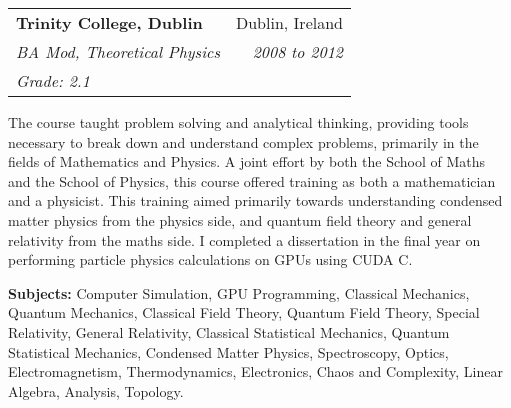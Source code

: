 \documentclass[11pt]{article}
\makeatletter
\newcommand{\resumeSection}[1]{
    \par
    \vspace{\baselineskip}
    \large {\sc {#1}}
    \par
    \vspace{-0.9\baselineskip}
    \hrulefill
    \vspace{0.5\baselineskip}
    \par
}
\newenvironment{resumeSubSectionHeader}{
    \par
    \begin{tabular*}{\textwidth}{l@{\extracolsep{\fill}}r}
    \par
} {
    \end{tabular*}
    \par
}
\newenvironment{resumeSubSectionBody}{
    \par
    \vspace{-0.8\parskip}
    \begin{small}
    \par
} {
    \par
    \end{small}
    \par
}
\makeatother
\begin{document}
%
%
\begin{resumeSubSectionHeader}

    \textbf{Trinity College, Dublin}   & Dublin, Ireland     \\
    \emph{BA Mod, Theoretical Physics} & \emph{2008 to 2012} \\
    \emph{Grade: 2.1}

\end{resumeSubSectionHeader}
\begin{resumeSubSectionBody}

    The course taught problem solving and analytical thinking, providing
    tools necessary to break down and understand complex problems,
    primarily in the fields of Mathematics and Physics.
    A joint effort by both the School of Maths and the School of Physics,
    this course offered training as both a mathematician and a
    physicist.
    This training aimed primarily towards understanding condensed matter
    physics from the physics side, and quantum field theory and general
    relativity from the maths side.
    I completed a dissertation in the final year on performing particle
    physics calculations on GPUs using CUDA C.

    \begin{description}
        \item{\bf Subjects:}
            Computer Simulation, GPU Programming,
            Classical Mechanics, Quantum Mechanics,
            Classical Field Theory, Quantum Field Theory,
            Special Relativity, General Relativity,
            Classical Statistical Mechanics, Quantum Statistical Mechanics,
            Condensed Matter Physics, Spectroscopy,
            Optics, Electromagnetism, Thermodynamics,
            Electronics, Chaos and Complexity,
            Linear Algebra, Analysis,
            Topology.
    \end{description}

\end{resumeSubSectionBody}






\resumeSection{Awards}
\end{document}
